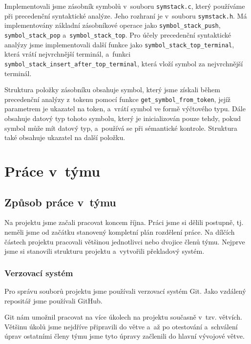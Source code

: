 \documentclass[a4paper, 11pt]{article}
\begin{document}
	Implementovali jsme zásobník symbolů v~souboru \texttt{symstack.c}, který používáme při precedenční syntaktické analýze.
	Jeho rozhraní je v~souboru \texttt{symstack.h}. Má implementovány základní zásobníkové operace jako \texttt{symbol\_stack\_push},
	\texttt{symbol\_stack\_pop} a~\texttt{symbol\_stack\_top}. Pro účely precedenční syntaktické analýzy jsme implementovali další
	funkce jako \texttt{symbol\_stack\_top\_terminal}, která vrátí nejvrchnější terminál, a~funkci
	\texttt{symbol\_stack\_insert\_after\_top\_terminal}, která vloží symbol za nejvrchnější terminál.

	Struktura položky zásobníku obsahuje symbol, který jsme získali během precedenční analýzy z~tokenu pomocí funkce
	\texttt{get\_symbol\_from\_token}, jejíž parametrem je ukazatel na token, a~vrátí symbol ve formě výčtového typu.
	Dále obsahuje datový typ tohoto symbolu, který je inicializován pouze tehdy, pokud symbol může mít datový typ,
	a~používá se při sémantické kontrole. Struktura také obsahuje ukazatel na další položku.


	\section{Práce v~týmu}

	\subsection{Způsob práce v~týmu}

	Na projektu jsme začali pracovat koncem října. Práci jsme si dělili postupně, tj. neměli jsme od začátku
	stanovený kompletní plán rozdělení práce. Na dílčích částech projektu pracovali většinou jednotlivci nebo
	dvojice členů týmu. Nejprve jsme si stanovili strukturu projektu a~vytvořili překladový systém.

	\subsubsection{Verzovací systém}

	Pro správu souborů projektu jsme používali verzovací systém Git. Jako vzdálený repositář jsme používali \mbox{GitHub}.

	Git nám umožnil pracovat na více úkolech na projektu současně v~tzv. větvích. Většinu úkolů jsme nejdříve připravili
	do větve a~až po otestování a~schválení úprav ostatními členy týmu jsme tyto úpravy začlenili do hlavní
	vývojové větve.
\end{document}
